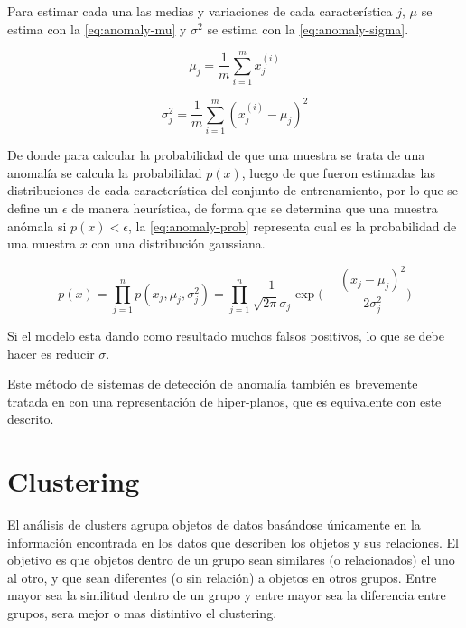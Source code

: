 Para estimar cada una las medias y variaciones de cada característica $j$, $\mu$ se estima con la \cref{eq:anomaly-mu} y $\sigma^2$ se estima con la \cref{eq:anomaly-sigma}.

\begin{equation} \label{eq:anomaly-mu}
  \mu_j = \frac{1}{m} \sum_{i=1}^{m} x_j^{(i)}
\end{equation}

\begin{equation} \label{eq:anomaly-sigma}
  \sigma_j^2 = \frac{1}{m} \sum_{i=1}^{m} (x_j^{(i)} - \mu_j)^2
\end{equation}

De donde para calcular la probabilidad de que una muestra se trata de una anomalía se calcula la probabilidad $p(x)$, luego de que fueron estimadas las distribuciones de cada característica del conjunto de entrenamiento, por lo que se define un $\epsilon$ de manera heurística, de forma que se determina que una muestra anómala si $p(x) < \epsilon$, la \cref{eq:anomaly-prob} representa cual es la probabilidad de una muestra $x$ con una distribución gaussiana.

\begin{equation} \label{eq:anomaly-prob}
  p(x) = \prod_{j=1}^{n}p(x_j, \mu_j, \sigma_j^2) = \prod_{j=1}^{n} \frac{1}{\sqrt{2\pi}\sigma_j} \exp\Bigg( - \frac{(x_j-\mu_j)^2}{2\sigma_j^2}\Bigg)
\end{equation}

Si el modelo esta dando como resultado muchos falsos positivos, lo que se debe hacer es reducir $\sigma$.

Este método de sistemas de detección de anomalía también es brevemente tratada en \cite{osint} con una representación de hiper-planos, que es equivalente con este descrito.


\section{Clustering} \label{subsec:clustering}
El análisis de clusters agrupa objetos de datos basándose únicamente en la información encontrada en los datos que describen los objetos y sus relaciones. El objetivo es que objetos dentro de un grupo sean similares (o relacionados) el uno al otro, y que sean diferentes (o sin relación) a objetos en otros grupos. Entre mayor sea la similitud dentro de un grupo y entre mayor sea la diferencia entre grupos, sera mejor o mas distintivo el clustering.

